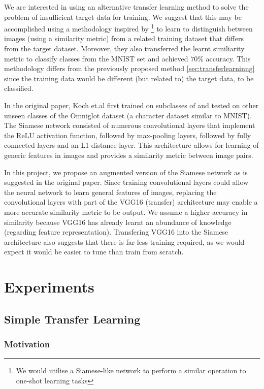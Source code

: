 \documentclass{article}
\begin{document}
We are interested in using an alternative transfer learning method to solve the problem of insufficient target data for training. We suggest that this may be accomplished using a methodology inspired by \cite{koch}\footnote{We would utilise a Siamese-like network to perform a similar operation to one-shot learning tasks} to learn to distinguish between images (using a similarity metric) from a related training dataset that differs from the target dataset. Moreover, they also transferred the learnt similiarity metric to classify classes from the MNIST set and achieved $70\%$ accuracy. This methodology differs from the previously proposed method \ref{sec:transferlearninng} since the training data would be different (but related to) the target data, to be classified.

In the original paper, Koch et.al first trained on subclasses of and tested on other unseen classes of the Omniglot dataset (a character dataset similar to MNIST). The Siamese network consisted of numerous convolutional layers that implement the ReLU activation function, followed by max-pooling layers, followed by fully connected layers and an L1 distance layer. This architecture allows for learning of generic features in images and provides a similarity metric between image pairs.

In this project, we propose an augmented version of the Siamese network as is suggested in the original paper. Since training convolutional layers could allow the neural network to learn general features of images, replacing the convolutional layers with part of the VGG16 (transfer) architecture may enable a more accurate similarity metric to be output. We assume a higher accuracy in similarity because VGG16 has already learnt an abundance of knowledge (regarding feature representation). Transfering VGG16 into the Siamese architecture also suggests that there is far less training required, as we would expect it would be easier to tune than train from scratch.

\section{Experiments}
\label{sec:experiments}

\subsection{Simple Transfer Learning}

\subsubsection{\textbf{Motivation}}
\end{document}
